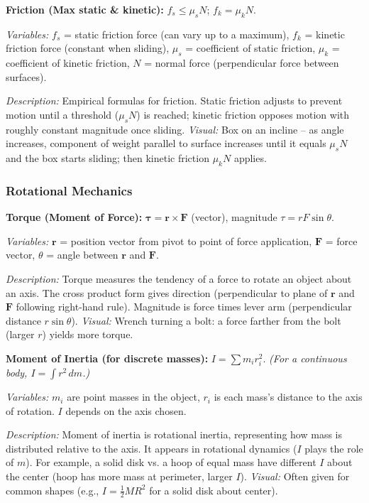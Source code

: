 \documentclass{article}
\begin{document}
\textbf{Friction (Max static \& kinetic):} $f_s \le \mu_s N$;  $f_k = \mu_k N$.

\textit{Variables:} $f_s$ = static friction force (can vary up to a maximum), $f_k$ = kinetic friction force (constant when sliding), $\mu_s$ = coefficient of static friction, $\mu_k$ = coefficient of kinetic friction, $N$ = normal force (perpendicular force between surfaces).

\textit{Description:} Empirical formulas for friction. Static friction adjusts to prevent motion until a threshold ($\mu_s N$) is reached; kinetic friction opposes motion with roughly constant magnitude once sliding. \textit{Visual:} Box on an incline – as angle increases, component of weight parallel to surface increases until it equals $\mu_s N$ and the box starts sliding; then kinetic friction $\mu_k N$ applies.

\subsubsection*{Rotational Mechanics}

\textbf{Torque (Moment of Force):} $\boldsymbol{\tau} = \mathbf{r} \times \mathbf{F}$ (vector), magnitude $\tau = r F \sin\theta$.

\textit{Variables:} $\mathbf{r}$ = position vector from pivot to point of force application, $\mathbf{F}$ = force vector, $\theta$ = angle between $\mathbf{r}$ and $\mathbf{F}$.

\textit{Description:} Torque measures the tendency of a force to rotate an object about an axis. The cross product form gives direction (perpendicular to plane of $\mathbf{r}$ and $\mathbf{F}$ following right-hand rule). Magnitude is force times lever arm (perpendicular distance $r\sin\theta$). \textit{Visual:} Wrench turning a bolt: a force farther from the bolt (larger $r$) yields more torque.

\textbf{Moment of Inertia (for discrete masses):} $I = \sum m_i r_i^2$. \textit{(For a continuous body, $I=\int r^2 \,dm$.)}

\textit{Variables:} $m_i$ are point masses in the object, $r_i$ is each mass’s distance to the axis of rotation. $I$ depends on the axis chosen.

\textit{Description:} Moment of inertia is rotational inertia, representing how mass is distributed relative to the axis. It appears in rotational dynamics ($I$ plays the role of $m$). For example, a solid disk vs. a hoop of equal mass have different $I$ about the center (hoop has more mass at perimeter, larger $I$). \textit{Visual:} Often given for common shapes (e.g., $I=\frac{1}{2}MR^2$ for a solid disk about center).
\end{document}
